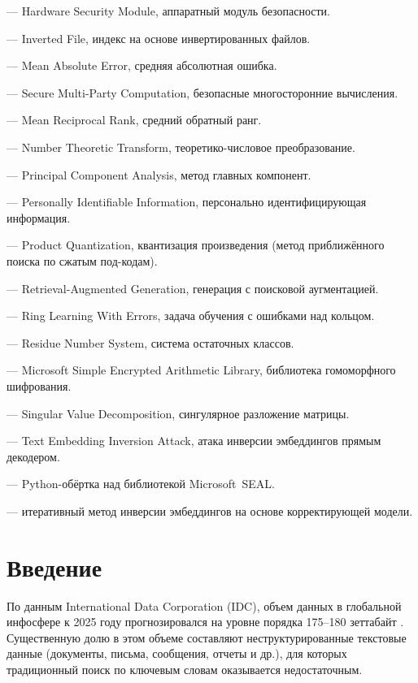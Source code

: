 \documentclass[a4paper, 12pt, oneside, openany]{article}
\begin{document}
\begin{description}[style=nextline, leftmargin=3.2cm, labelwidth=3.0cm,
	labelsep=0.2cm, font=\normalfont\bfseries, itemsep=2pt]
	\item[HSM]     --- Hardware Security Module, аппаратный модуль
	безопасности.
	\item[IVF]     --- Inverted File, индекс на основе инвертированных
	файлов.
	\item[MAE]     --- Mean Absolute Error, средняя абсолютная
	ошибка.
	\item[MPC]     --- Secure Multi-Party Computation, безопасные
	мно\-го\-сто\-рон\-ние вы\-чис\-ле\-ния.
	\item[MRR]     --- Mean Reciprocal Rank, средний обратный ранг.
	\item[NTT]     --- Number Theoretic Transform,
	теоретико-числовое преобразование.
	\item[PCA]     --- Principal Component Analysis, метод главных
	компонент.
	\item[PII]     --- Personally Identifiable Information,
	персонально идентифицирующая информация.
	\item[PQ]      --- Product Quantization, квантизация произведения
	(метод приближённого поиска по сжатым
	под-кодам).
	\item[RAG]     --- Retrieval-Augmented Generation, генерация
	с поисковой аугментацией.
	\item[RLWE]    --- Ring Learning With Errors, задача обучения
	с ошибками над кольцом.
	\item[RNS]     --- Residue Number System, система остаточных
	классов.
	\item[SEAL]    --- Microsoft Simple Encrypted Arithmetic Library,
	библиотека гомоморфного шифрования.
	\item[SVD]     --- Singular Value Decomposition, сингулярное
	разложение матрицы.
	\item[TEIA]    --- Text Embedding Inversion Attack, атака
	инверсии эмбеддингов прямым декодером.
	\item[TenSEAL] --- Python-обёртка над библиотекой Microsoft~SEAL.
	\item[Vec2Text]--- итеративный метод инверсии эмбеддингов
	на основе корректирующей модели.
\end{description}

\section*{Введение}
По данным International Data Corporation (IDC), объем данных в глобальной инфосфере к 2025 году прогнозировался на уровне порядка 175--180 зеттабайт \cite{ref1}. Существенную долю в этом объеме составляют неструктурированные текстовые данные (документы, письма, сообщения, отчеты и др.), для которых традиционный поиск по ключевым словам оказывается недостаточным.
\end{document}
